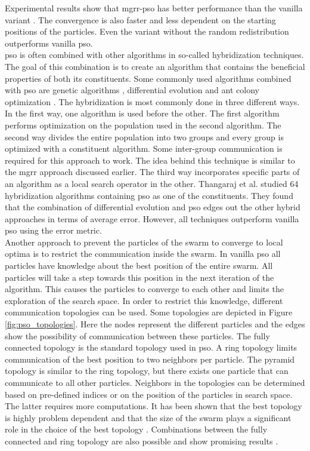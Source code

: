 Experimental results show that \gls{mgrr}-\gls{pso} has better performance than the vanilla variant \cite{opposite_cs}. The convergence is also faster and less dependent on the starting positions of the particles. Even the variant without the random redistribution outperforms vanilla \gls{pso}.\\  

\gls{pso} is often combined with other algorithms in so-called hybridization techniques. The goal of this combination is to create an algorithm that contains the beneficial properties of both its constituents. Some commonly used algorithms combined with \gls{pso} are genetic algorithms \cite{genetic_algorithm}, differential evolution \cite{differential_evolution} and ant colony optimization \cite{aco}. The hybridization is most commonly done in three different ways. In the first way, one algorithm is used before the other. The first algorithm performs optimization on the population used in the second algorithm. The second way divides the entire population into two groups and every group is optimized with a constituent algorithm. Some inter-group communication is required for this approach to work. The idea behind this technique is similar to the \gls{mgrr} approach discussed earlier. The third way incorporates specific parts of an algorithm as a local search operator in the other. Thangaraj et al. \cite{hybridization_survey} studied 64 hybridization algorithms containing \gls{pso} as one of the constituents. They found that the combination of differential evolution and \gls{pso} edges out the other hybrid approaches in terms of average error. However, all techniques outperform vanilla \gls{pso} using the error metric.\\

Another approach to prevent the particles of the swarm to converge to local optima is to restrict the communication inside the swarm. In vanilla \gls{pso} all particles have knowledge about the best position of the entire swarm. All particles will take a step towards this position in the next iteration of the algorithm. This causes the particles to converge to each other and limits the exploration of the search space. In order to restrict this knowledge, different communication topologies can be used. Some topologies are depicted in Figure \ref{fig:pso_topologies}. Here the nodes represent the different particles and the edges show the possibility of communication between these particles. The fully connected topology is the standard topology used in \gls{pso}. A ring topology limits communication of the best position to two neighbors per particle. The pyramid topology is similar to the ring topology, but there exists one particle that can communicate to all other particles. Neighbors in the topologies can be determined based on pre-defined indices or on the position of the particles in search space. The latter requires more computations. It has been shown that the best topology is highly problem dependent and that the size of the swarm plays a significant role in the choice of the best topology \cite{pso_topologies}. Combinations between the fully connected and ring topology are also possible and show promising results \cite{fc_ring}.



